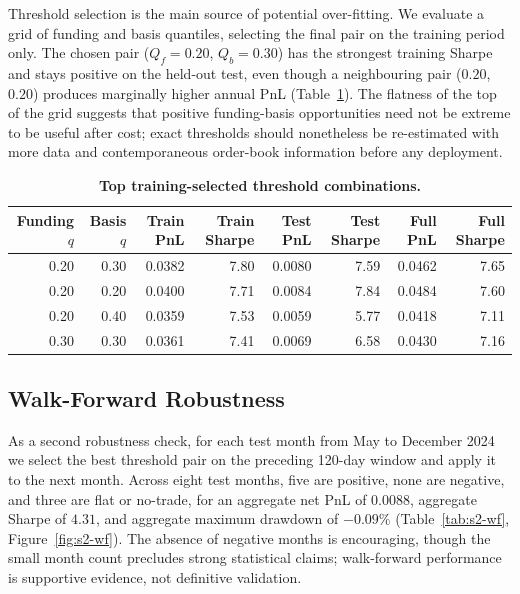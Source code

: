 \documentclass[10pt,twocolumn,a4paper]{article}
\begin{document}
Threshold selection is the main source of potential over-fitting.  We
evaluate a grid of funding and basis quantiles, selecting the final pair on
the training period only.  The chosen pair ($Q_f=0.20$, $Q_b=0.30$) has the
strongest training Sharpe and stays positive on the held-out test, even
though a neighbouring pair ($0.20$, $0.20$) produces marginally higher
annual PnL (Table~\ref{tab:s2-thresh}).  The flatness of the top of the
grid suggests that positive funding-basis opportunities need not be
extreme to be useful after cost; exact thresholds should nonetheless be
re-estimated with more data and contemporaneous order-book information
before any deployment.

\begin{table}[t!]
  \centering
  \caption{\textbf{Top training-selected threshold combinations.}}
  \label{tab:s2-thresh}
  \begin{tabular}{rrrrrrrr}
    \toprule
    \textbf{Funding $q$} & \textbf{Basis $q$} & \textbf{Train PnL}
      & \textbf{Train Sharpe} & \textbf{Test PnL} & \textbf{Test Sharpe}
      & \textbf{Full PnL} & \textbf{Full Sharpe} \\
    \midrule
    0.20 & 0.30 & 0.0382 & 7.80 & 0.0080 & 7.59 & 0.0462 & 7.65 \\
    0.20 & 0.20 & 0.0400 & 7.71 & 0.0084 & 7.84 & 0.0484 & 7.60 \\
    0.20 & 0.40 & 0.0359 & 7.53 & 0.0059 & 5.77 & 0.0418 & 7.11 \\
    0.30 & 0.30 & 0.0361 & 7.41 & 0.0069 & 6.58 & 0.0430 & 7.16 \\
    \bottomrule
  \end{tabular}
\end{table}

\subsection{Walk-Forward Robustness}

As a second robustness check, for each test month from May to December
2024 we select the best threshold pair on the preceding 120-day window and
apply it to the next month.  Across eight test months, five are positive,
none are negative, and three are flat or no-trade, for an aggregate net PnL
of $0.0088$, aggregate Sharpe of $4.31$, and aggregate maximum drawdown of
$-0.09\%$ (Table~\ref{tab:s2-wf}, Figure~\ref{fig:s2-wf}).  The absence of
negative months is encouraging, though the small month count precludes
strong statistical claims; walk-forward performance is supportive evidence,
not definitive validation.
\end{document}
